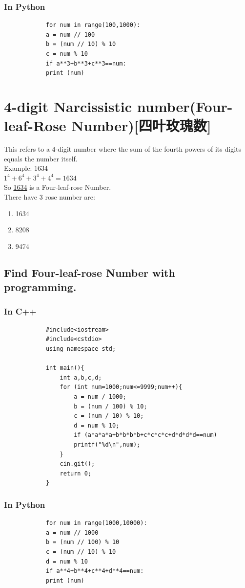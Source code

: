 \documentclass[12pt,a4paper,]{ctexart}
\begin{document}
\begin{flushleft}
		\subsubsection{In Python}
		\begin{lstlisting}
			for num in range(100,1000):
			a = num // 100
			b = (num // 10) % 10
			c = num % 10
			if a**3+b**3+c**3==num:
			print (num)
		\end{lstlisting}
		\section {4-digit Narcissistic number(Four-leaf-Rose Number)[四叶玫瑰数]}
		This refers to a 4-digit number where the sum of the fourth powers of its digits equals the number itself.\\
		Example: 1634\\
		$1^4+6^4+3^4+4^4 = 1634$\\
		So \underline{1634} is a Four-leaf-rose Number.\\
		There have 3 rose number are:
		\begin{enumerate}
			\item 1634
			\item 8208
			\item 9474
		\end{enumerate}
		\subsection {Find Four-leaf-rose Number with programming.}
		\subsubsection{In C++}
		\begin{lstlisting}
			#include<iostream>
			#include<cstdio>
			using namespace std;
			
			int main(){
				int a,b,c,d;
				for (int num=1000;num<=9999;num++){
					a = num / 1000;
					b = (num / 100) % 10;
					c = (num / 10) % 10;
					d = num % 10;
					if (a*a*a*a+b*b*b*b+c*c*c*c+d*d*d*d==num)
					printf("%d\n",num);
				}
				cin.git();
				return 0;
			}
		\end{lstlisting}
		\subsubsection{In Python}
		\begin{lstlisting}
			for num in range(1000,10000):
			a = num // 1000
			b = (num // 100) % 10
			c = (num // 10) % 10
			d = num % 10
			if a**4+b**4+c**4+d**4==num:
			print (num)
		\end{lstlisting}

\end{flushleft}
\end{document}
